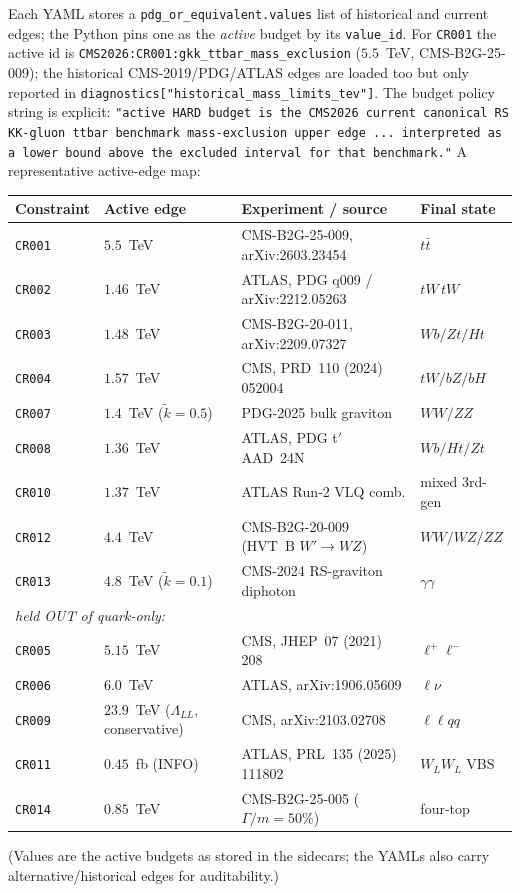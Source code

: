\documentclass[11pt]{article}
\newcommand{\code}[1]{\texttt{#1}}
\theoremstyle{definition}
\begin{document}
Each YAML stores a \code{pdg\_or\_equivalent.values} list of historical and
current edges; the Python pins one as the \emph{active} budget by its
\code{value\_id}. For \code{CR001} the active id is
\code{CMS2026:CR001:gkk\_ttbar\_mass\_exclusion} ($5.5$~TeV, CMS-B2G-25-009);
the historical CMS-2019/PDG/ATLAS edges are loaded too but only reported in
\code{diagnostics["historical\_mass\_limits\_tev"]}. The budget policy string is
explicit: \code{"active HARD budget is the CMS2026 current canonical RS KK-gluon
ttbar benchmark mass-exclusion upper edge ... interpreted as a lower bound above
the excluded interval for that benchmark."} A representative active-edge map:
\begin{center}\small
\begin{tabular}{llll}
\toprule
Constraint & Active edge & Experiment / source & Final state \\
\midrule
\code{CR001} & $5.5$~TeV & CMS-B2G-25-009, arXiv:2603.23454 & $t\bar t$ \\
\code{CR002} & $1.46$~TeV & ATLAS, PDG q009 / arXiv:2212.05263 & $tW\,tW$ \\
\code{CR003} & $1.48$~TeV & CMS-B2G-20-011, arXiv:2209.07327 & $Wb/Zt/Ht$ \\
\code{CR004} & $1.57$~TeV & CMS, PRD~110 (2024) 052004 & $tW/bZ/bH$ \\
\code{CR007} & $1.4$~TeV ($\tilde k{=}0.5$) & PDG-2025 bulk graviton & $WW/ZZ$ \\
\code{CR008} & $1.36$~TeV & ATLAS, PDG t$'$ AAD~24N & $Wb/Ht/Zt$ \\
\code{CR010} & $1.37$~TeV & ATLAS Run-2 VLQ comb. & mixed 3rd-gen \\
\code{CR012} & $4.4$~TeV & CMS-B2G-20-009 (HVT~B $W'{\to}WZ$) & $WW/WZ/ZZ$ \\
\code{CR013} & $4.8$~TeV ($\tilde k{=}0.1$) & CMS-2024 RS-graviton diphoton & $\gamma\gamma$ \\
\midrule
\multicolumn{4}{l}{\emph{held OUT of quark-only:}} \\
\code{CR005} & $5.15$~TeV & CMS, JHEP~07 (2021) 208 & $\ell^+\ell^-$ \\
\code{CR006} & $6.0$~TeV & ATLAS, arXiv:1906.05609 & $\ell\nu$ \\
\code{CR009} & $23.9$~TeV ($\Lambda_{LL}$, conservative) & CMS, arXiv:2103.02708 & $\ell\ell qq$ \\
\code{CR011} & $0.45$~fb (INFO) & ATLAS, PRL~135 (2025) 111802 & $W_L W_L$ VBS \\
\code{CR014} & $0.85$~TeV & CMS-B2G-25-005 ($\Gamma/m{=}50\%$) & four-top \\
\bottomrule
\end{tabular}
\end{center}
(Values are the active budgets as stored in the sidecars; the YAMLs also carry
alternative/historical edges for auditability.)
\end{document}
